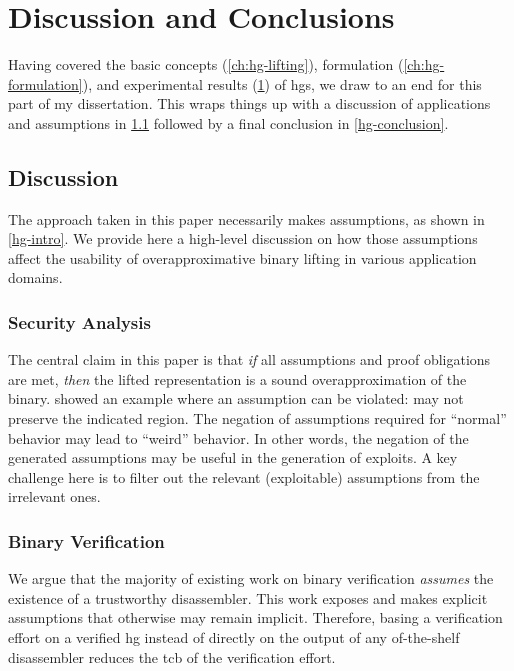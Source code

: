 \chapter{Discussion and Conclusions}\label{ch:hg-discussion}
Having covered the basic concepts (\cref{ch:hg-lifting}), formulation (\cref{ch:hg-formulation}), and experimental results (\cref{ch:hg-discussion}) of \acp{hg}, we draw to an end for this part of my dissertation.
This  wraps things up with a discussion of applications and assumptions in \cref{hg-discussion} followed by a final conclusion in \cref{hg-conclusion}.

\section{Discussion}\label{hg-discussion}
The approach taken in this paper necessarily makes assumptions, as shown in \cref{hg-intro}.
We provide here a high-level discussion on how those assumptions affect the usability of overapproximative binary lifting in various application domains.

\subsection{Security Analysis}
The central claim in this paper is that \emph{if} all assumptions and proof obligations are met,
\emph{then} the lifted representation is a sound overapproximation of the binary.
 showed an example where an assumption can be violated:  may not preserve the indicated region.
The negation of assumptions required for ``normal'' behavior may lead to ``weird'' behavior.
In other words, the negation of the generated assumptions may be useful in the generation of exploits.
A key challenge here is to filter out the relevant (exploitable) assumptions from the irrelevant ones.

\subsection{Binary Verification}
We argue that the majority of existing work on binary verification \emph{assumes} the existence of a trustworthy disassembler.
This work exposes and makes explicit assumptions that otherwise may remain implicit.
Therefore, basing a verification effort on a verified \ac{hg} instead of directly on the output of any of-the-shelf disassembler reduces the \ac{tcb} of the verification effort.

